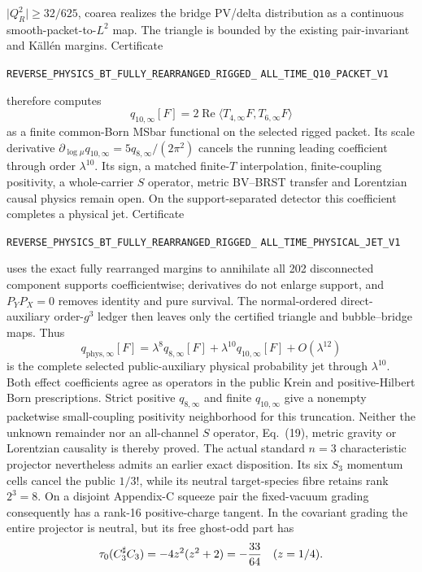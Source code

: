 \documentclass[11pt]{article}
\theoremstyle{definition}
\theoremstyle{remark}
\begin{document}
\(\lvert Q_R^2\rvert\ge32/625\), coarea realizes the bridge PV/delta
distribution as a continuous smooth-packet-to-\(L^2\) map.  The triangle is
bounded by the existing pair-invariant and Källén margins.
Certificate
\par\noindent
\texttt{REVERSE\_PHYSICS\_BT\_FULLY\_REARRANGED\_RIGGED\_}
\allowbreak\texttt{ALL\_TIME\_Q10\_PACKET\_V1}
\par\noindent
therefore computes
\[
 q_{10,\infty}[F]
 =2\operatorname{Re}\langle
 T_{4,\infty}F,T_{6,\infty}F\rangle
\]
as a finite common-Born MSbar functional on the selected rigged packet.
Its scale derivative
\(\partial_{\log\mu}q_{10,\infty}=5q_{8,\infty}/(2\pi^2)\) cancels the
running leading coefficient through order \(\lambda^{10}\).  Its sign, a
matched finite-\(T\) interpolation, finite-coupling positivity, a
whole-carrier \(S\) operator, metric BV--BRST transfer and Lorentzian causal
physics remain open.
On the support-separated detector this coefficient completes a physical jet.
Certificate
\par\noindent
\texttt{REVERSE\_PHYSICS\_BT\_FULLY\_REARRANGED\_RIGGED\_}
\allowbreak\texttt{ALL\_TIME\_PHYSICAL\_JET\_V1}
\par\noindent
uses the exact fully rearranged margins to annihilate all 202 disconnected
component supports coefficientwise; derivatives do not enlarge support, and
$P_YP_X=0$ removes identity and pure survival.  The normal-ordered
direct-auxiliary order-$g^3$ ledger then leaves only the certified triangle
and bubble--bridge maps.  Thus
\[
 q_{\mathrm{phys},\infty}[F]
 =\lambda^8q_{8,\infty}[F]
 +\lambda^{10}q_{10,\infty}[F]+O(\lambda^{12})
\]
is the complete selected public-auxiliary physical probability jet through
$\lambda^{10}$.  Both effect coefficients agree as operators in the public
Krein and positive-Hilbert Born prescriptions.  Strict positive
$q_{8,\infty}$ and finite $q_{10,\infty}$ give a nonempty packetwise
small-coupling positivity neighborhood for this truncation.  Neither the
unknown remainder nor an all-channel $S$ operator, Eq.~(19), metric gravity
or Lorentzian causality is thereby proved.
The actual standard \(n=3\) characteristic projector nevertheless admits an
earlier exact disposition.  Its six \(S_3\) momentum cells cancel the public
\(1/3!\), while its neutral target-species fibre retains rank \(2^3=8\).
On a disjoint Appendix-C squeeze pair the fixed-vacuum grading consequently
has a rank-16 positive-charge tangent.  In the covariant grading the entire
projector is neutral, but its free ghost-odd part has
\[
 \tau_0(C_3^\sharp C_3)=-4z^2(z^2+2)=-{33\over64}\quad(z=1/4).
\]
\end{document}

